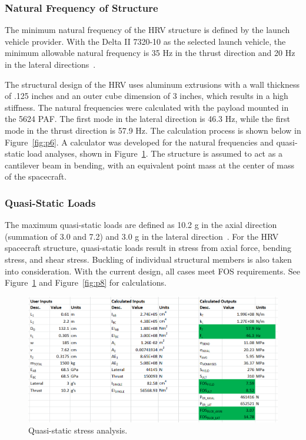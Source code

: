 \documentclass[paper=letter, fontsize=11pt]{scrartcl} %
\numberwithin{equation}{section} %
\numberwithin{figure}{section} %
\numberwithin{table}{section} %
\begin{document}
\subsubsection{Natural Frequency of Structure}
The minimum natural frequency of the HRV structure is defined by the launch vehicle provider. With the Delta II 7320-10 as the selected launch vehicle, the minimum allowable natural frequency is 35 Hz in the thrust direction and 20 Hz in the lateral directions~\cite{delta2}.

The structural design of the HRV uses aluminum extrusions with a wall thickness of .125 inches and an outer cube dimension of 3 inches, which results in a high stiffness. The natural frequencies were calculated with the payload mounted in the 5624 PAF. The first mode in the lateral direction is 46.3 Hz, while the first mode in the thrust direction is 57.9 Hz. The calculation process is shown below in Figure~\ref{fig:p6}. A calculator was developed for the natural frequencies and quasi-static load analyses, shown in Figure~\ref{fig:p7}. The structure is assumed to act as a cantilever beam in bending, with an equivalent point mass at the center of mass of the spacecraft.

\subsubsection{Quasi-Static Loads}

The maximum quasi-static loads are defined as 10.2 g in the axial direction (summation of 3.0 and 7.2) and 3.0 g in the lateral direction~\cite{delta2}. For the HRV spacecraft structure, quasi-static loads result in stress from axial force, bending stress, and shear stress. Buckling of individual structural members is also taken into consideration. With the current design, all cases meet FOS requirements. See Figure~\ref{fig:p7} and Figure~\ref{fig:p8} for calculations.

\begin{figure}[H]
    \begin{center}
        \includegraphics[width=1\textwidth]{Pics/7.png}
        \caption{Quasi-static stress analysis.}
        \label{fig:p7}
    \end{center}
\end{figure}
\end{document}
